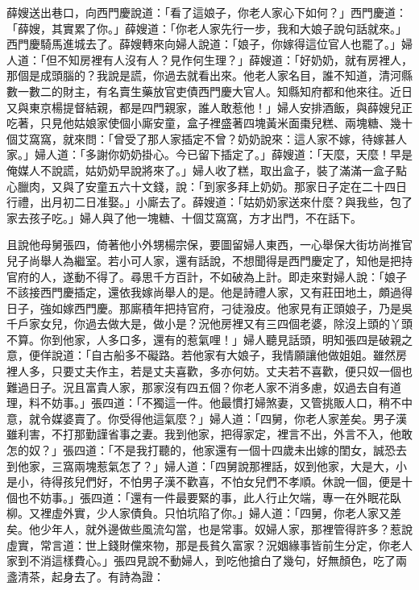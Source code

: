 \begin{showcontents}{}
薛嫂送出巷口，向西門慶說道：「看了這娘子，你老人家心下如何？」西門慶道：「薛嫂，其實累了你。」薛嫂道：「你老人家先行一步，我和大娘子說句話就來。」西門慶騎馬進城去了。薛嫂轉來向婦人說道：「娘子，你嫁得這位官人也罷了。」婦人道：「但不知房裡有人沒有人？見作何生理？」薛嫂道：「好奶奶，就有房裡人，那個是成頭腦的？我說是謊，你過去就看出來。他老人家名目，誰不知道，清河縣數一數二的財主，有名賣生藥放官吏債西門慶大官人。知縣知府都和他來往。近日又與東京楊提督結親，都是四門親家，誰人敢惹他！」婦人安排酒飯，與薛嫂兒正吃著，只見他姑娘家使個小廝安童，盒子裡盛著四塊黃米面棗兒糕、兩塊糖、幾十個艾窩窩，就來問：「曾受了那人家插定不曾？奶奶說來：這人家不嫁，待嫁甚人家。」婦人道：「多謝你奶奶掛心。今已留下插定了。」薛嫂道：「天麼，天麼！早是俺媒人不說謊，姑奶奶早說將來了。」婦人收了糕，取出盒子，裝了滿滿一盒子點心臘肉，又與了安童五六十文錢，說：「到家多拜上奶奶。那家日子定在二十四日行禮，出月初二日准娶。」小廝去了。薛嫂道：「姑奶奶家送來什麼？與我些，包了家去孩子吃。」婦人與了他一塊糖、十個艾窩窩，方才出門，不在話下。

且說他母舅張四，倚著他小外甥楊宗保，要圖留婦人東西，一心舉保大街坊尚推官兒子尚舉人為繼室。若小可人家，還有話說，不想聞得是西門慶定了，知他是把持官府的人，遂動不得了。尋思千方百計，不如破為上計。即走來對婦人說：「娘子不該接西門慶插定，還依我嫁尚舉人的是。他是詩禮人家，又有莊田地土，頗過得日子，強如嫁西門慶。那廝積年把持官府，刁徒潑皮。他家見有正頭娘子，乃是吳千戶家女兒，你過去做大是，做小是？況他房裡又有三四個老婆，除沒上頭的丫頭不算。你到他家，人多口多，還有的惹氣哩！」婦人聽見話頭，明知張四是破親之意，便佯說道：「自古船多不礙路。若他家有大娘子，我情願讓他做姐姐。雖然房裡人多，只要丈夫作主，若是丈夫喜歡，多亦何妨。丈夫若不喜歡，便只奴一個也難過日子。況且富貴人家，那家沒有四五個？你老人家不消多慮，奴過去自有道理，料不妨事。」張四道：「不獨這一件。他最慣打婦煞妻，又管挑販人口，稍不中意，就令媒婆賣了。你受得他這氣麼？」婦人道：「四舅，你老人家差矣。男子漢雖利害，不打那勤謹省事之妻。我到他家，把得家定，裡言不出，外言不入，他敢怎的奴？」張四道：「不是我打聽的，他家還有一個十四歲未出嫁的閨女，誠恐去到他家，三窩兩塊惹氣怎了？」婦人道：「四舅說那裡話，奴到他家，大是大，小是小，待得孩兒們好，不怕男子漢不歡喜，不怕女兒們不孝順。休說一個，便是十個也不妨事。」張四道：「還有一件最要緊的事，此人行止欠端，專一在外眠花臥柳。又裡虛外實，少人家債負。只怕坑陷了你。」婦人道：「四舅，你老人家又差矣。他少年人，就外邊做些風流勾當，也是常事。奴婦人家，那裡管得許多？惹說虛實，常言道：世上錢財儻來物，那是長貧久富家？況姻緣事皆前生分定，你老人家到不消這樣費心。」張四見說不動婦人，到吃他搶白了幾句，好無顏色，吃了兩盞清茶，起身去了。有詩為證：


\end{showcontents}

